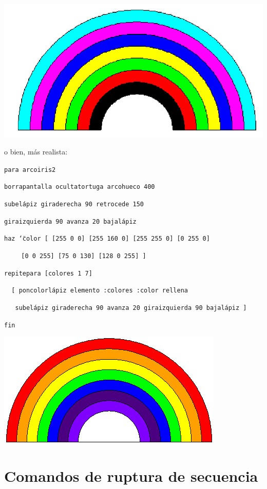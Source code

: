 \begin{center}
   \includegraphics[scale=0.4]{Imagenes/05_Primitivas/arcoiris.png}
\end{center}
o bien, m\'as realista:

\noindent \texttt{para arcoiris2}

\texttt{borrapantalla ocultatortuga arcohueco 400}

\texttt{subel\'apiz giraderecha 90 retrocede 150}

\texttt{giraizquierda 90 avanza 20 bajal\'apiz}

\texttt{haz \char`\"{}color [ [255 0 0] [255 160 0] [255 255 0] [0 255 0]}

\verb+   + \texttt{ [0 0 255] [75 0 130] [128 0 255] ]}

\texttt{repitepara [colores 1 7]}

\verb+ + \texttt{ [ poncolorl\'apiz elemento :colores :color rellena} 

\verb+  + \texttt{ subel\'apiz giraderecha 90 avanza 20 giraizquierda 90 bajal\'apiz ]}

\noindent \texttt{fin}
\begin{center}
   \includegraphics[scale=0.6]{Imagenes/05_Primitivas/arcoiris_2.png}
\end{center}

\section{Comandos de ruptura de secuencia}
   \label{Ruptura-Secuencia}

